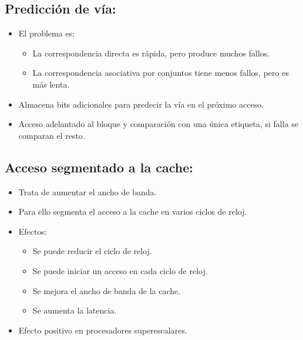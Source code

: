 \documentclass[12pt, twoside, openright]{report} %
\begin{document}
  \subsection{Predicción de vía:}

    \begin{itemize}
    
    \item
      El problema es:

      \begin{itemize}
      
      \item
        La correspondencia directa es rápida, pero produce muchos
        fallos.
      \item
        La correspondencia asociativa por conjuntos tiene menos fallos,
        pero es más lenta.
      \end{itemize}
    \item
      Almacena bits adicionales para predecir la vía en el próximo
      acceso.
    \item
      Acceso adelantado al bloque y comparación con una única etiqueta,
      si falla se comparan el resto.
    \end{itemize}
  \subsection{Acceso segmentado a la cache:}

    \begin{itemize}
    
    \item
      Trata de aumentar el ancho de banda.
    \item
      Para ello segmenta el acceso a la cache en varios ciclos de reloj.
    \item
      Efectos:

      \begin{itemize}
      
      \item
        Se puede reducir el ciclo de reloj.
      \item
        Se puede iniciar un acceso en cada ciclo de reloj.
      \item
        Se mejora el ancho de banda de la cache.
      \item
        Se aumenta la latencia.
      \end{itemize}
    \item
      Efecto positivo en procesadores superescalares.
    \end{itemize}
\end{document}
